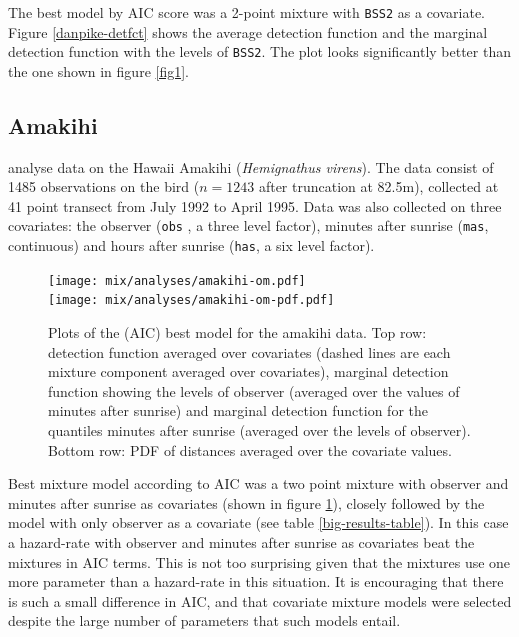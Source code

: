 The best model by AIC score was a 2-point mixture with \texttt{BSS2} as a covariate. Figure \ref{danpike-detfct} shows the average detection function and the marginal detection function with the levels of \texttt{BSS2}. The plot looks significantly better than the one shown in figure \ref{fig1}.

\subsection{Amakihi}
 analyse data on the Hawaii Amakihi (\textit{Hemignathus virens}). The data consist of 1485 observations on the bird ($n=1243$ after truncation at 82.5m), collected at 41 point transect from July 1992 to April 1995. Data was also collected on three covariates: the observer (\texttt{obs} , a three level factor), minutes after sunrise (\texttt{mas}, continuous) and hours after sunrise (\texttt{has}, a six level factor).

\begin{figure}
\centering
\texttt{[image: mix/analyses/amakihi-om.pdf]}\\
\texttt{[image: mix/analyses/amakihi-om-pdf.pdf]}
\caption{Plots of the (AIC) best model for the amakihi data. Top row: detection function averaged over covariates (dashed lines are each mixture component averaged over covariates), marginal detection function showing the levels of observer (averaged over the values of minutes after sunrise) and marginal detection function for the quantiles minutes after sunrise (averaged over the levels of observer). Bottom row: PDF of distances averaged over the covariate values.}
\label{amakihi}
\end{figure}

Best mixture model according to AIC was a two point mixture with observer and minutes after sunrise as covariates (shown in figure \ref{amakihi}), closely followed by the model with only observer as a covariate (see table \ref{big-results-table}). In this case a hazard-rate with observer and minutes after sunrise as covariates beat the mixtures in AIC terms. This is not too surprising given that the mixtures use one more parameter than a hazard-rate in this situation. It is encouraging that there is such a small difference in AIC, and that covariate mixture models were selected despite the large number of parameters that such models entail.


